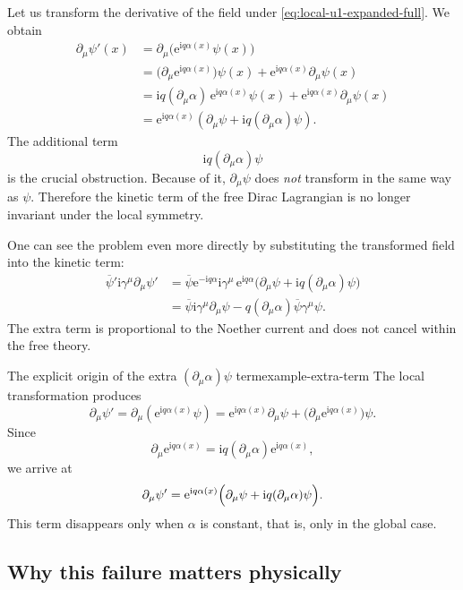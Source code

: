 \documentclass[11pt,a4paper]{article}
\newcommand{\ii}{\mathrm{i}}
\newcommand{\ee}{\mathrm{e}}
\newcommand{\p}{\partial}
\newcommand{\gmu}{\gamma^\mu}
\newcommand{\psibar}{\overline{\psi}}
\begin{document}
Let us transform the derivative of the field under \eqref{eq:local-u1-expanded-full}. We obtain
\begin{align}
\p_\mu\psi'(x)
&=
\p_\mu\bigl(\ee^{\ii q\alpha(x)}\psi(x)\bigr)
\nonumber\\
&=
\bigl(\p_\mu\ee^{\ii q\alpha(x)}\bigr)\psi(x)+\ee^{\ii q\alpha(x)}\p_\mu\psi(x)
\nonumber\\
&=
\ii q(\p_\mu\alpha)\,\ee^{\ii q\alpha(x)}\psi(x)+\ee^{\ii q\alpha(x)}\p_\mu\psi(x)
\nonumber\\
&=
\ee^{\ii q\alpha(x)}\left(\p_\mu\psi+\ii q(\p_\mu\alpha)\psi\right).
\label{eq:ordinary-derivative-local-expanded}
\end{align}
The additional term
\[
\ii q(\p_\mu\alpha)\psi
\]
is the crucial obstruction. Because of it, \(\p_\mu\psi\) does \emph{not} transform in the same way as \(\psi\). Therefore the kinetic term of the free Dirac Lagrangian is no longer invariant under the local symmetry.

One can see the problem even more directly by substituting the transformed field into the kinetic term:
\begin{align}
\psibar'\ii\gmu\p_\mu\psi'
&=
\psibar\ee^{-\ii q\alpha}\ii\gmu\,\ee^{\ii q\alpha}\bigl(\p_\mu\psi+\ii q(\p_\mu\alpha)\psi\bigr)
\nonumber\\
&=
\psibar\ii\gmu\p_\mu\psi - q(\p_\mu\alpha)\psibar\gamma^\mu\psi.
\label{eq:kinetic-term-local-obstruction}
\end{align}
The extra term is proportional to the Noether current and does not cancel within the free theory.

\begin{examplebox}{The explicit origin of the extra \texorpdfstring{$(\p_\mu\alpha)\psi$}{(∂μ α) ψ} term}{example-extra-term}
The local transformation produces
\[
\p_\mu\psi'=
\p_\mu(\ee^{\ii q\alpha(x)}\psi)
=
\ee^{\ii q\alpha(x)}\p_\mu\psi+\bigl(\p_\mu\ee^{\ii q\alpha(x)}\bigr)\psi.
\]
Since
\[
\p_\mu\ee^{\ii q\alpha(x)}=
\ii q(\p_\mu\alpha)\ee^{\ii q\alpha(x)},
\]
we arrive at
\[
\p_\mu\psi'=
\ee^{\ii q\alpha(x)}\Bigl(\p_\mu\psi+\ii q(\p_\mu\alpha)\psi\Bigr).
\]
This term disappears only when \(\alpha\) is constant, that is, only in the global case.
\end{examplebox}



\subsection{Why this failure matters physically}
\end{document}
